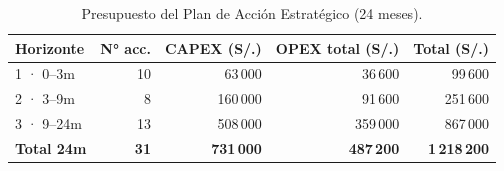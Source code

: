 \begin{table}[h]
\centering\small
\begin{tabular}{lrrrr}
\toprule
\textbf{Horizonte} & \textbf{N° acc.} & \textbf{CAPEX (S/.)} & \textbf{OPEX total (S/.)} & \textbf{Total (S/.)} \\
\midrule
1 · 0--3m & 10 & 63\,000 & 36\,600 & 99\,600 \\
2 · 3--9m & 8 & 160\,000 & 91\,600 & 251\,600 \\
3 · 9--24m & 13 & 508\,000 & 359\,000 & 867\,000 \\
\midrule
\textbf{Total 24m} & \textbf{31} & \textbf{731\,000} & \textbf{487\,200} & \textbf{1\,218\,200} \\
\bottomrule
\end{tabular}
\caption{Presupuesto del Plan de Acción Estratégico (24 meses).}
\label{tab:presupuesto}
\end{table}